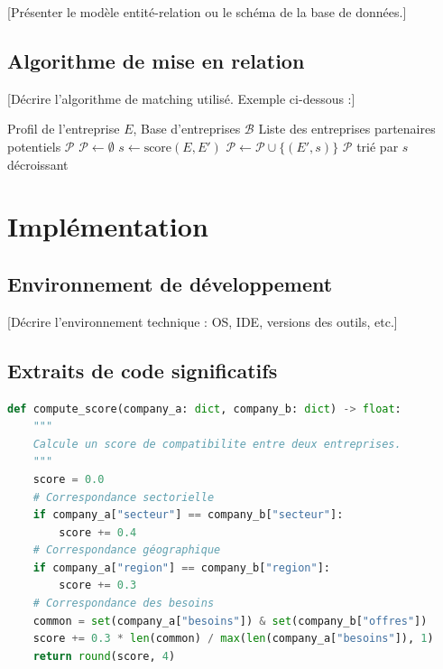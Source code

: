 \documentclass[12pt, a4paper, oneside]{report}
\begin{document}
[Présenter le modèle entité-relation ou le schéma de la base de données.]

\subsection{Algorithme de mise en relation}

[Décrire l'algorithme de matching utilisé. Exemple ci-dessous :]

\begin{algorithm}[H]
  \caption{Algorithme de mise en relation des entreprises}
  \label{alg:matching}
  \begin{algorithmic}[1]
    \Require Profil de l'entreprise $E$, Base d'entreprises $\mathcal{B}$
    \Ensure Liste des entreprises partenaires potentiels $\mathcal{P}$
    \State $\mathcal{P} \leftarrow \emptyset$
      \State $s \leftarrow \text{score}(E, E')$
        \State $\mathcal{P} \leftarrow \mathcal{P} \cup \{(E', s)\}$
      \EndIf
    \EndFor
    \State \Return $\mathcal{P}$ trié par $s$ décroissant
  \end{algorithmic}
\end{algorithm}

\section{Implémentation}
\label{sec:implementation}

\subsection{Environnement de développement}

[Décrire l'environnement technique : OS, IDE, versions des outils, etc.]

\subsection{Extraits de code significatifs}

\begin{lstlisting}[language=Python, caption=Exemple : calcul du score de compatibilité]
def compute_score(company_a: dict, company_b: dict) -> float:
    """
    Calcule un score de compatibilite entre deux entreprises.
    """
    score = 0.0
    # Correspondance sectorielle
    if company_a["secteur"] == company_b["secteur"]:
        score += 0.4
    # Correspondance géographique
    if company_a["region"] == company_b["region"]:
        score += 0.3
    # Correspondance des besoins
    common = set(company_a["besoins"]) & set(company_b["offres"])
    score += 0.3 * len(common) / max(len(company_a["besoins"]), 1)
    return round(score, 4)
\end{lstlisting}
\end{document}
